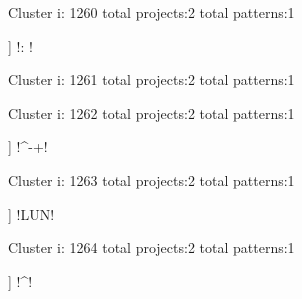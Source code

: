 Cluster i: 1260
total projects:2
total patterns:1
\begin{multicols}{1}
\begin{description}[noitemsep,topsep=0pt]
\item [[2] ] \cverb!: !
\end{description}
\end{multicols}







Cluster i: 1261
total projects:2
total patterns:1
\begin{multicols}{1}
\end{multicols}







Cluster i: 1262
total projects:2
total patterns:1
\begin{multicols}{1}
\begin{description}[noitemsep,topsep=0pt]
\item [[2] ] \cverb!^-+!
\end{description}
\end{multicols}







Cluster i: 1263
total projects:2
total patterns:1
\begin{multicols}{1}
\begin{description}[noitemsep,topsep=0pt]
\item [[2] ] \cverb!LUN!
\end{description}
\end{multicols}







Cluster i: 1264
total projects:2
total patterns:1
\begin{multicols}{1}
\begin{description}[noitemsep,topsep=0pt]
\item [[2] ] \cverb!^\n!
\end{description}
\end{multicols}







